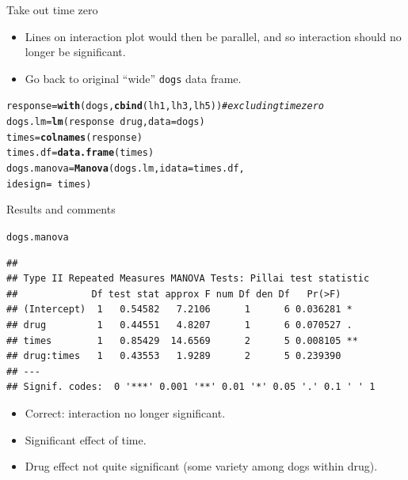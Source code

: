 \documentclass[unknownkeysallowed]{beamer}\usepackage[]{graphicx}\usepackage[]{color}
\makeatletter
\newcommand{\hlcom}[1]{\textcolor[rgb]{0.678,0.584,0.686}{\textit{#1}}}%
\newcommand{\hlopt}[1]{\textcolor[rgb]{0,0,0}{#1}}%
\newcommand{\hlstd}[1]{\textcolor[rgb]{0.345,0.345,0.345}{#1}}%
\newcommand{\hlkwb}[1]{\textcolor[rgb]{0.69,0.353,0.396}{#1}}%
\newcommand{\hlkwc}[1]{\textcolor[rgb]{0.333,0.667,0.333}{#1}}%
\newcommand{\hlkwd}[1]{\textcolor[rgb]{0.737,0.353,0.396}{\textbf{#1}}}%
\newenvironment{kframe}{%
 \def\at@end@of@kframe{}%
 \ifinner\ifhmode%
  \def\at@end@of@kframe{\end{minipage}}%
  \begin{minipage}{\columnwidth}%
 \fi\fi%
 \def\FrameCommand##1{\hskip\@totalleftmargin \hskip-\fboxsep
 \colorbox{shadecolor}{##1}\hskip-\fboxsep
     \hskip-\linewidth \hskip-\@totalleftmargin \hskip\columnwidth}%
 \MakeFramed {\advance\hsize-\width
   \@totalleftmargin\z@ \linewidth\hsize
   \@setminipage}}%
 {\par\unskip\endMakeFramed%
 \at@end@of@kframe}
\newenvironment{knitrout}{}{} %
\makeatother
\begin{document}
\begin{frame}[fragile]{Take out time zero}

  \begin{itemize}
  \item Lines on interaction plot would then be parallel, and so interaction should
no longer be significant.
\item Go back to original ``wide'' \texttt{dogs} data frame.
  \end{itemize}
  

 
\begin{knitrout}\footnotesize
{}\color{fgcolor}\begin{kframe}
\begin{alltt}
\hlstd{response}\hlkwb{=}\hlkwd{with}\hlstd{(dogs,}\hlkwd{cbind}\hlstd{(lh1,lh3,lh5))} \hlcom{# excluding time zero}
\hlstd{dogs.lm}\hlkwb{=}\hlkwd{lm}\hlstd{(response}\hlopt{~}\hlstd{drug,}\hlkwc{data}\hlstd{=dogs)}
\hlstd{times}\hlkwb{=}\hlkwd{colnames}\hlstd{(response)}
\hlstd{times.df}\hlkwb{=}\hlkwd{data.frame}\hlstd{(times)}
\hlstd{dogs.manova}\hlkwb{=}\hlkwd{Manova}\hlstd{(dogs.lm,}\hlkwc{idata}\hlstd{=times.df,}
                   \hlkwc{idesign}\hlstd{=}\hlopt{~}\hlstd{times)}
\end{alltt}
\end{kframe}
\end{knitrout}


\end{frame}

\begin{frame}[fragile]{Results and comments}

 
\begin{knitrout}\footnotesize
{}\color{fgcolor}\begin{kframe}
\begin{alltt}
\hlstd{dogs.manova}
\end{alltt}
\begin{verbatim}
## 
## Type II Repeated Measures MANOVA Tests: Pillai test statistic
##             Df test stat approx F num Df den Df   Pr(>F)   
## (Intercept)  1   0.54582   7.2106      1      6 0.036281 * 
## drug         1   0.44551   4.8207      1      6 0.070527 . 
## times        1   0.85429  14.6569      2      5 0.008105 **
## drug:times   1   0.43553   1.9289      2      5 0.239390   
## ---
## Signif. codes:  0 '***' 0.001 '**' 0.01 '*' 0.05 '.' 0.1 ' ' 1
\end{verbatim}
\end{kframe}
\end{knitrout}

\begin{itemize}
\item Correct: interaction no longer significant.
\item Significant effect of time.
\item Drug effect not quite significant (some variety among dogs
  within drug).
\end{itemize}
  
\end{frame}
\end{document}
